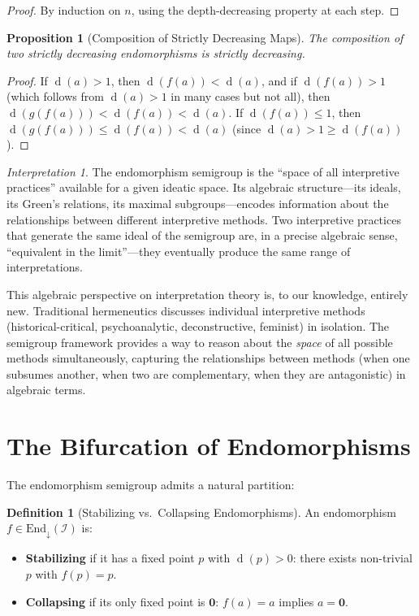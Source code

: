 \documentclass[11pt,openany]{book}
\theoremstyle{definition}
\newtheorem{definition}[axiom]{Definition}
\theoremstyle{plain}
\newtheorem{proposition}[axiom]{Proposition}
\theoremstyle{remark}
\newtheorem{interpretation}[axiom]{Interpretation}
\newcommand{\IS}{\mathcal{I}}               %
\newcommand{\void}{\mathbf{0}}              %
\newcommand{\depth}{\operatorname{d}}       %
\begin{document}
\begin{proof}
By induction on $n$, using the depth-decreasing property at each step.
\end{proof}

\begin{proposition}[Composition of Strictly Decreasing Maps]
The composition of two strictly decreasing endomorphisms is strictly decreasing.
\end{proposition}

\begin{proof}
If $\depth(a) > 1$, then $\depth(f(a)) < \depth(a)$, and if $\depth(f(a)) > 1$ (which follows from $\depth(a) > 1$ in many cases but not all), then $\depth(g(f(a))) < \depth(f(a)) < \depth(a)$. If $\depth(f(a)) \leq 1$, then $\depth(g(f(a))) \leq \depth(f(a)) < \depth(a)$ (since $\depth(a) > 1 \geq \depth(f(a))$).
\end{proof}

\begin{interpretation}
The endomorphism semigroup is the ``space of all interpretive practices'' available for a given ideatic space. Its algebraic structure---its ideals, its Green's relations, its maximal subgroups---encodes information about the relationships between different interpretive methods. Two interpretive practices that generate the same ideal of the semigroup are, in a precise algebraic sense, ``equivalent in the limit''---they eventually produce the same range of interpretations.

This algebraic perspective on interpretation theory is, to our knowledge, entirely new. Traditional hermeneutics discusses individual interpretive methods (historical-critical, psychoanalytic, deconstructive, feminist) in isolation. The semigroup framework provides a way to reason about the \emph{space} of all possible methods simultaneously, capturing the relationships between methods (when one subsumes another, when two are complementary, when they are antagonistic) in algebraic terms.
\end{interpretation}

\section{The Bifurcation of Endomorphisms}

The endomorphism semigroup admits a natural partition:

\begin{definition}[Stabilizing vs.\ Collapsing Endomorphisms]
An endomorphism $f \in \mathrm{End}_\downarrow(\IS)$ is:
\begin{itemize}
\item \textbf{Stabilizing} if it has a fixed point $p$ with $\depth(p) > 0$: there exists non-trivial $p$ with $f(p) = p$.
\item \textbf{Collapsing} if its only fixed point is $\void$: $f(a) = a$ implies $a = \void$.
\end{itemize}
\end{definition}
\end{document}
